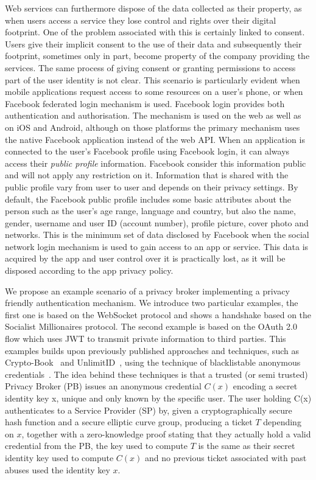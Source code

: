Web services can furthermore dispose of the data collected as their property, as when users access a service they lose control and rights over their digital footprint. One of the problem associated with this is certainly linked to consent. Users give their implicit consent to the use of their data and subsequently their footprint, sometimes only in part, become property of the company providing the services. The same process of giving consent or granting permissions to access part of the user identity is not clear. This scenario is particularly evident when mobile applications request access to some resources on a user's phone, or when Facebook federated login mechanism is used. Facebook login provides both authentication and authorisation. The mechanism is used on the web as well as on iOS and Android, although on those platforms the primary mechanism uses the native Facebook application instead of the web API. When an application is connected to the user's Facebook profile using Facebook login, it can always access their \emph{public profile} information. Facebook consider this information public and will not apply any restriction on it. Information that is shared with the public profile vary from user to user and depends on their privacy settings. By default, the Facebook public profile includes some basic attributes about the person such as the user's age range, language and country, but also the name, gender, username and user ID (account number), profile picture, cover photo and networks. This is the minimum set of data disclosed by Facebook when the social network login mechanism is used to gain access to an app or service. This data is acquired by the app and user control over it is practically lost, as it will be disposed according to the app privacy policy.


We propose an example scenario of a privacy broker implementing a privacy friendly authentication mechanism. We introduce two particular examples, the first one is based on the WebSocket protocol and shows a handshake based on the Socialist Millionaires protocol. The second example is based on the OAuth 2.0 flow which uses JWT to transmit private information to third parties. This examples builds upon previously published approaches and techniques, such as Crypto-Book~\cite{maheswaran2013crypto} and UnlimitID~\cite{isaakidis2016unlimitid}, using the technique of blacklistable anonymous credentials~\cite{tsang2007blacklistable}. The idea behind these techniques is that a trusted (or semi trusted) Privacy Broker (PB) issues an anonymous credential $C(x)$ encoding a secret identity key x, unique and only known by the specific user. The user holding C(x) authenticates to a Service Provider (SP) by, given a cryptographically secure hash function and a secure elliptic curve group, producing a ticket $T$ depending on $x$, together with a zero-knowledge proof stating that they actually hold a valid credential from the PB, the key used to compute $T$ is the same as their secret identity key used to compute $C(x)$ and no previous ticket associated with past abuses used the identity key $x$. 

